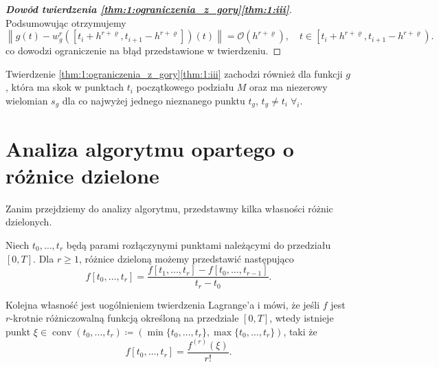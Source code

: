 \documentclass[oik, pdftex, man]{mgrwms}
\DeclareMathOperator*{\conv}{conv}
\begin{document}
\begin{proof}[\textbf{Dowód twierdzenia \ref{thm:1:ograniczenia_z_gory}\ref{thm:1:iii}}]
        Podsumowując otrzymujemy
        \begin{equation*}
            \left\|g(t)-w_{g}^{r}\left(\left[t_{i}+h^{r+\varrho}, t_{i+1}-h^{r+\varrho}\right]\right)(t)\right\|=\mathcal{O}\left(h^{r+\varrho}\right), \quad t \in\left[t_{i}+h^{r+\varrho}, t_{i+1}-h^{r+\varrho}\right).
        \end{equation*}
        co dowodzi ograniczenie na błąd przedstawione w twierdzeniu.

    \end{proof}

    \begin{uw}
        Twierdzenie \ref{thm:1:ograniczenia_z_gory}\ref{thm:1:iii} zachodzi również dla funkcji $g$, która ma skok w punktach $t_{i}$ początkowego podziału $M$ oraz ma niezerowy wielomian $s_{g}$ dla co najwyżej jednego nieznanego punktu $t_{g}$, $t_{g} \neq t_{i} \; \forall_{i}$.
    \end{uw}


\section{Analiza algorytmu opartego o różnice dzielone}


    Zanim przejdziemy do analizy algorytmu, przedstawmy kilka własności różnic dzielonych.

    Niech $t_{0}, \ldots, t_{r}$ będą parami rozłączynymi punktami należącymi do przedziału $[0, T]$. Dla $r \geq 1$, różnice dzieloną możemy przedstawić następująco
    \begin{equation*}
        f[t_{0}, \ldots, t_{r}] = \frac{f[t_{1}, \ldots, t_{r}] - f[t_{0}, \ldots, t_{r-1}]}{t_{r}-t_{0}}.
    \end{equation*}
    
    Kolejna własność jest uogólnieniem twierdzenia Lagrange'a i mówi, że jeśli $f$ jest $r$-krotnie różniczowalną funkcją określoną na przedziale $[0,T]$, wtedy istnieje punkt $\xi \in \conv (t_{0}, \ldots, t_{r}) \coloneqq \left( \min \{t_{0}, \ldots, t_{r}\}, \max \{t_{0}, \ldots, t_{r}\} \right)$, taki że
    \begin{equation*} %
        f\left[ t_{0}, \ldots, t_{r} \right] = \frac{f^{(r)}(\xi)}{r!}.
    \end{equation*}
    
\end{document}
